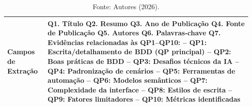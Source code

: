\begin{table}[htbp]
\centering
\footnotesize
\renewcommand{\arraystretch}{1.05}

\caption{Formulário de Extração de Dados}
\label{tab:form-extracao}

\begin{tabular}{|p{3.8cm}|p{9.5cm}|}
\hline
\textbf{Campos de Extração} &
Q1. Título \newline
Q2. Resumo \newline
Q3. Ano de Publicação \newline
Q4. Fonte de Publicação \newline
Q5. Autores \newline
Q6. Palavras-chave \newline
Q7. Evidências relacionadas às QP1–QP10: \newline
\quad -- QP1: Escrita/detalhamento de BDD (QP principal) \newline
\quad -- QP2: Boas práticas de BDD \newline
\quad -- QP3: Desafios técnicos da IA \newline
\quad -- QP4: Padronização de cenários \newline
\quad -- QP5: Ferramentas de automação \newline
\quad -- QP6: Modelos semânticos \newline
\quad -- QP7: Complexidade da interface \newline
\quad -- QP8: Estilos de escrita \newline
\quad -- QP9: Fatores limitadores \newline
\quad -- QP10: Métricas identificadas
\\ \hline
\end{tabular}
\begin{center}\caption*{Fonte: Autores (2026).}\end{center}
\end{table}

